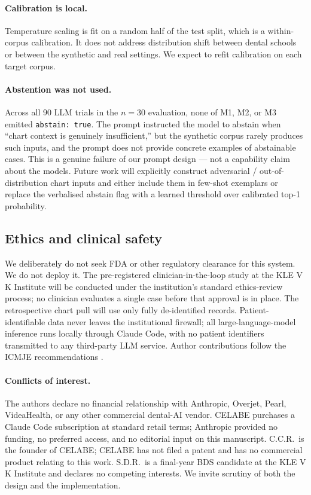 \documentclass[preprint,authoryear,1p,12pt]{elsarticle}
\begin{document}
\paragraph{Calibration is local.} Temperature scaling is fit on a
random half of the test split, which is a within-corpus calibration. It
does not address distribution shift between dental schools or between
the synthetic and real settings. We expect to refit calibration on each
target corpus.

\paragraph{Abstention was not used.} Across all 90 LLM trials in the
$n{=}30$ evaluation, none of M1, M2, or M3 emitted \texttt{abstain:
true}. The prompt instructed the model to abstain when ``chart context
is genuinely insufficient,'' but the synthetic corpus rarely produces
such inputs, and the prompt does not provide concrete examples of
abstainable cases. This is a genuine failure of our prompt design ---
not a capability claim about the models. Future work will explicitly
construct adversarial / out-of-distribution chart inputs and either
include them in few-shot exemplars or replace the verbalised abstain
flag with a learned threshold over calibrated top-1 probability.

\subsection{Ethics and clinical safety}
\label{sec:ethics}

We deliberately do not seek FDA or other regulatory clearance for this
system. We do not deploy it. The pre-registered clinician-in-the-loop
study at the KLE V K Institute will be conducted under the institution's
standard ethics-review process; no clinician evaluates a single case
before that approval is in place. The retrospective chart pull will use
only fully de-identified records. Patient-identifiable data never leaves
the institutional firewall; all large-language-model inference runs
locally through Claude Code, with no patient identifiers transmitted
to any third-party LLM service. Author contributions follow the ICMJE
recommendations \citep{icmje2024recommendations}.

\paragraph{Conflicts of interest.} The authors declare no financial
relationship with Anthropic, Overjet, Pearl, VideaHealth, or any other
commercial dental-AI vendor. CELABE purchases a Claude Code subscription
at standard retail terms; Anthropic provided no funding, no preferred
access, and no editorial input on this manuscript. C.C.R.\ is the
founder of CELABE; CELABE has not filed a patent and has no commercial
product relating to this work. S.D.R.\ is a final-year BDS candidate
at the KLE V K Institute and declares no competing interests. We invite
scrutiny of both the design and the implementation.
\end{document}
